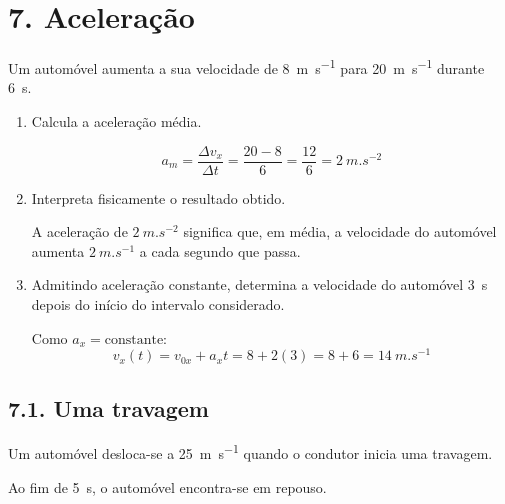 \documentclass[11pt,a4paper]{article}
\begin{document}
	\section*{7. Aceleração}
	
	Um automóvel aumenta a sua velocidade de
	\SI{8}{m.s^{-1}} para \SI{20}{m.s^{-1}} durante \SI{6}{s}.
	
	\begin{enumerate}[label=\textbf{\arabic*.},resume]
		
		\item Calcula a aceleração média.
		
		\begin{solucao}
			\[
			a_m = \frac{\Delta v_x}{\Delta t} = \frac{20 - 8}{6} = \frac{12}{6} = \SI{2}{m.s^{-2}}
			\]
		\end{solucao}
		
		\item Interpreta fisicamente o resultado obtido.
		
		\begin{solucao}
			A aceleração de $\SI{2}{m.s^{-2}}$ significa que, em média, a velocidade do automóvel aumenta $\SI{2}{m.s^{-1}}$ a cada segundo que passa.
		\end{solucao}
		
		\item Admitindo aceleração constante, determina a velocidade do automóvel
		\SI{3}{s} depois do início do intervalo considerado.
		
		\begin{solucao}
			Como $a_x = \text{constante}$:
			\[
			v_x(t) = v_{0x} + a_x t = 8 + 2(3) = 8 + 6 = \SI{14}{m.s^{-1}}
			\]
		\end{solucao}
		
	\end{enumerate}
	
	\subsection*{7.1. Uma travagem}
	
	Um automóvel desloca-se a \SI{25}{m.s^{-1}} quando o condutor inicia uma
	travagem.
	
	Ao fim de \SI{5}{s}, o automóvel encontra-se em repouso.
	
\end{document}
